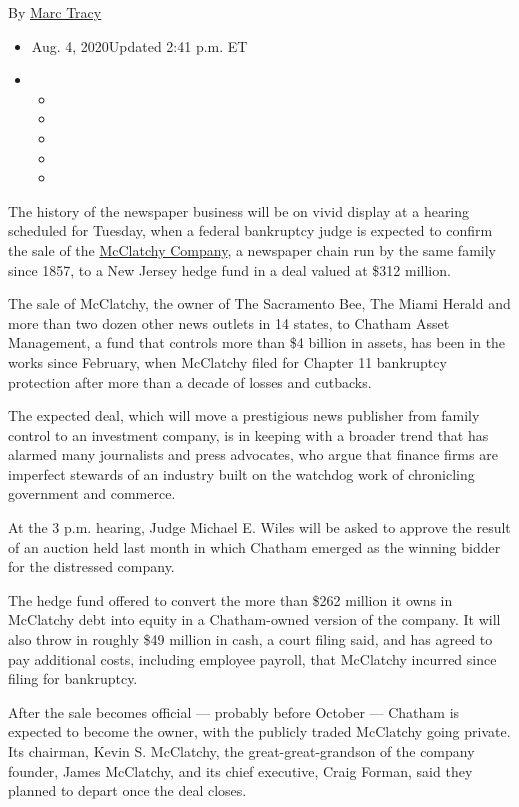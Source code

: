 By \href{https://www.nytimes.com/by/marc-tracy}{Marc Tracy}

\begin{itemize}
\item
  Aug. 4, 2020Updated 2:41 p.m. ET
\item
  \begin{itemize}
  \item
  \item
  \item
  \item
  \item
  \end{itemize}
\end{itemize}

The history of the newspaper business will be on vivid display at a
hearing scheduled for Tuesday, when a federal bankruptcy judge is
expected to confirm the sale of the
\href{https://www.nytimes.com/2020/07/12/business/media/hedge-fund-mcclatchy-newspapers.html}{McClatchy
Company}, a newspaper chain run by the same family since 1857, to a New
Jersey hedge fund in a deal valued at \$312 million.

The sale of McClatchy, the owner of The Sacramento Bee, The Miami Herald
and more than two dozen other news outlets in 14 states, to Chatham
Asset Management, a fund that controls more than \$4 billion in assets,
has been in the works since February, when McClatchy filed for Chapter
11 bankruptcy protection after more than a decade of losses and
cutbacks.

The expected deal, which will move a prestigious news publisher from
family control to an investment company, is in keeping with a broader
trend that has alarmed many journalists and press advocates, who argue
that finance firms are imperfect stewards of an industry built on the
watchdog work of chronicling government and commerce.

At the 3 p.m. hearing, Judge Michael E. Wiles will be asked to approve
the result of an auction held last month in which Chatham emerged as the
winning bidder for the distressed company.

The hedge fund offered to convert the more than \$262 million it owns in
McClatchy debt into equity in a Chatham-owned version of the company. It
will also throw in roughly \$49 million in cash, a court filing said,
and has agreed to pay additional costs, including employee payroll, that
McClatchy incurred since filing for bankruptcy.

After the sale becomes official --- probably before October --- Chatham
is expected to become the owner, with the publicly traded McClatchy
going private. Its chairman, Kevin S. McClatchy, the
great-great-grandson of the company founder, James McClatchy, and its
chief executive, Craig Forman, said they planned to depart once the deal
closes.

